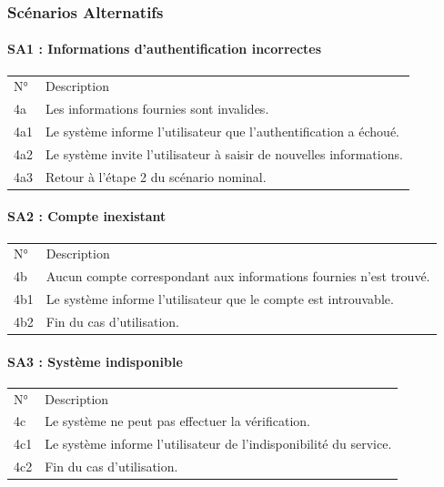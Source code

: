 \documentclass[
]{article}
\begin{document}
\hypertarget{scuxe9narios-alternatifs}{%
\subsubsection{Scénarios Alternatifs}\label{scuxe9narios-alternatifs}}

\hypertarget{sa1-informations-dauthentification-incorrectes}{%
\paragraph{SA1 : Informations d'authentification
incorrectes}\label{sa1-informations-dauthentification-incorrectes}}

\begin{longtable}[]{@{}ll@{}}
\toprule
\endhead
N° & Description \\
4a & Les informations fournies sont invalides. \\
4a1 & Le système informe l'utilisateur que l'authentification a
échoué. \\
4a2 & Le système invite l'utilisateur à saisir de nouvelles
informations. \\
4a3 & Retour à l'étape 2 du scénario nominal. \\
\bottomrule
\end{longtable}

\hypertarget{sa2-compte-inexistant}{%
\paragraph{SA2 : Compte inexistant}\label{sa2-compte-inexistant}}

\begin{longtable}[]{@{}ll@{}}
\toprule
\endhead
N° & Description \\
4b & Aucun compte correspondant aux informations fournies n'est
trouvé. \\
4b1 & Le système informe l'utilisateur que le compte est introuvable. \\
4b2 & Fin du cas d'utilisation. \\
\bottomrule
\end{longtable}

\hypertarget{sa3-systuxe8me-indisponible}{%
\paragraph{SA3 : Système
indisponible}\label{sa3-systuxe8me-indisponible}}

\begin{longtable}[]{@{}ll@{}}
\toprule
\endhead
N° & Description \\
4c & Le système ne peut pas effectuer la vérification. \\
4c1 & Le système informe l'utilisateur de l'indisponibilité du
service. \\
4c2 & Fin du cas d'utilisation. \\
\bottomrule
\end{longtable}
\end{document}
